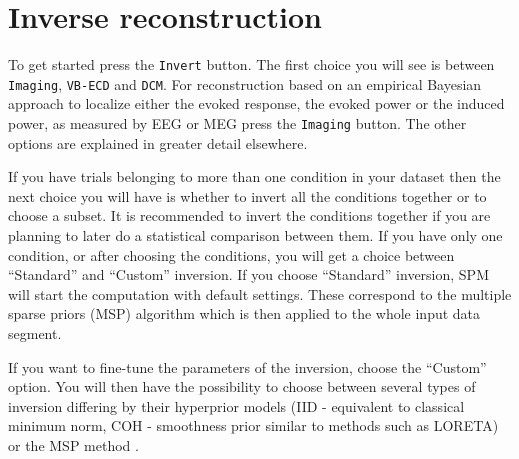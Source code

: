 \section{Inverse reconstruction}
To get started press the \texttt{Invert} button. The first choice you will see is between \texttt{Imaging}, \texttt{VB-ECD} and \texttt{DCM}. For reconstruction based on an empirical Bayesian approach to localize either the evoked response, the evoked power or the induced power, as measured by EEG or MEG press the \texttt{Imaging} button. The other options are explained in greater detail elsewhere.

If you have trials belonging to more than one condition in your dataset then the next choice you will have is whether to invert all the conditions together or to choose a subset. It is recommended to invert the conditions together if you are planning to later do a statistical comparison between them. If you have only one condition, or after choosing the conditions, you will get a choice between ``Standard'' and ``Custom'' inversion. If you choose ``Standard'' inversion, SPM will start the computation with default settings. These correspond to the multiple sparse priors (MSP) algorithm \cite{karl_msp} which is then applied to the whole input data segment.

If you want to fine-tune the parameters of the inversion, choose the ``Custom'' option. You will then have the possibility to choose between several types of inversion differing by their hyperprior models (IID - equivalent to classical minimum norm, COH - smoothness prior similar to methods such as LORETA) or the MSP method .

